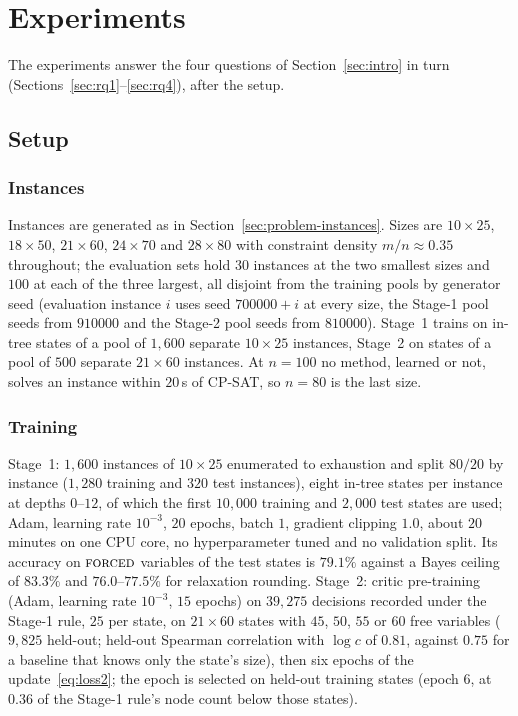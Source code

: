 \documentclass[final,5p,times,twocolumn,authoryear]{elsarticle}
\newcommand{\FORCED}{\textsc{forced}}
\begin{document}
\section{Experiments}
\label{sec:exp}

The experiments answer the four questions of Section~\ref{sec:intro} in turn (Sections~\ref{sec:rq1}--\ref{sec:rq4}), after the setup.

\subsection{Setup}
\label{sec:exp-setup}

\subsubsection{Instances}
Instances are generated as in Section~\ref{sec:problem-instances}. Sizes are $10\times25$, $18\times50$, $21\times60$, $24\times70$ and $28\times80$ with constraint density $m/n\approx0.35$ throughout; the evaluation sets hold $30$ instances at the two smallest sizes and $100$ at each of the three largest, all disjoint from the training pools by generator seed (evaluation instance $i$ uses seed $700000+i$ at every size, the Stage-1 pool seeds from $910000$ and the Stage-2 pool seeds from $810000$). Stage~1 trains on in-tree states of a pool of $1{,}600$ separate $10\times25$ instances, Stage~2 on states of a pool of $500$ separate $21\times60$ instances. At $n=100$ no method, learned or not, solves an instance within $20$\,s of CP-SAT, so $n=80$ is the last size.

\subsubsection{Training}
Stage~1: $1{,}600$ instances of $10\times25$ enumerated to exhaustion and split $80/20$ by instance ($1{,}280$ training and $320$ test instances), eight in-tree states per instance at depths $0$--$12$, of which the first $10{,}000$ training and $2{,}000$ test states are used; Adam, learning rate $10^{-3}$, $20$ epochs, batch $1$, gradient clipping $1.0$, about $20$ minutes on one CPU core, no hyperparameter tuned and no validation split. Its accuracy on $\FORCED$ variables of the test states is $79.1\%$ against a Bayes ceiling of $83.3\%$ and $76.0$--$77.5\%$ for relaxation rounding. Stage~2: critic pre-training (Adam, learning rate $10^{-3}$, $15$ epochs) on $39{,}275$ decisions recorded under the Stage-1 rule, $25$ per state, on $21\times60$ states with $45$, $50$, $55$ or $60$ free variables ($9{,}825$ held-out; held-out Spearman correlation with $\log c$ of $0.81$, against $0.75$ for a baseline that knows only the state's size), then six epochs of the update~\eqref{eq:loss2}; the epoch is selected on held-out training states (epoch $6$, at $0.36$ of the Stage-1 rule's node count below those states).
\end{document}
